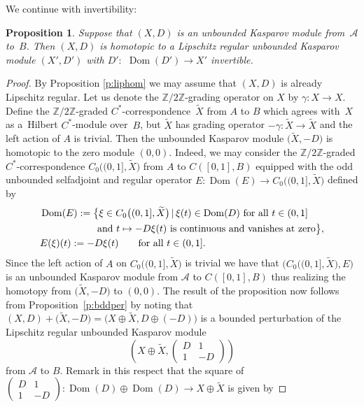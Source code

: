 \documentclass[11pt]{article}
\numberwithin{equation}{section}
\newtheorem{prop}[Theorem]{Proposition}
 { \theoremstyle{definition}
\newtheorem{dfn}[Theorem]{Definition}
\newtheorem{exa}[Theorem]{Example}
\newtheorem{rem}[Theorem]{Remark} }
\newcommand{\op}{\oplus}
\newcommand{\zz}{\mathbb{Z}}
\newcommand{\ga}{\gamma}
\newcommand{\s}[1]{\mathscr{#1}}
\newcommand{\wit}{\widetilde}
\begin{document}
We continue with invertibility:

\begin{prop}\label{p:lipinv}
Suppose that $(X,D)$ is an unbounded Kasparov module from~$\s A$ to~$B$. Then $(X,D)$ is homotopic to a Lipschitz regular unbounded Kasparov module $(X', D')$ with $D'\colon$ $\operatorname{Dom}(D') \to X'$ invertible.
\end{prop}
\begin{proof}By Proposition \ref{p:liphom} we may assume that $(X,D)$ is already Lipschitz regular. Let us denote the $\zz/2\zz$-grading operator on $X$ by $\ga\colon X \to X$. Define the $\zz/2\zz$-graded $C^*$-corresponden\-ce~$\wit{X}$ from $A$ to $B$ which agrees with~$X$ as a~Hilbert $C^*$-module over~$B$, but $\wit{X}$ has grading operator $-\ga\colon \wit{X} \to \wit{X}$ and the left action of $A$ is trivial. Then the unbounded Kasparov module $\big(\wit{X},-D\big)$ is homotopic to the zero module $(0,0)$. Indeed, we may consider the $\zz/2\zz$-graded $C^*$-correspondence $C_0\big( (0,1],\wit{X}\big)$ from $A$ to $C( [0,1],B)$ equipped with the odd unbounded selfadjoint and regular operator $E\colon \operatorname{Dom}(E) \to C_0\big( (0,1],\wit{X}\big)$ defined by
\begin{gather*}
\begin{split}
& \operatorname{Dom}(E) := \big\{ \xi \in C_0\big( (0,1],\wit{X}\big) \,|\, \xi(t) \in \operatorname{Dom}(D) \ \text{for all} \ t \in (0,1] \\
& \hphantom{\operatorname{Dom}(E) := \big\{}{} \text{and} \ t \mapsto - D \xi(t) \ \text{is continuous and vanishes at zero} \big\},\\
& E(\xi)(t) := - D \xi(t) \qquad \text{for all } t \in (0,1] .
\end{split}
\end{gather*}
Since the left action of $A$ on $C_0\big( (0,1],\wit{X}\big)$ is trivial we have that $\big( C_0\big( (0,1],\wit{X}\big), E\big)$ is an unbounded Kasparov module from $\s A$ to $C([0,1],B)$ thus realizing the homotopy from $\big(\wit{X},-D\big)$ to $(0,0)$. The result of the proposition now follows from Proposition~\ref{p:bddper} by noting that $(X,D) + \big(\wit{X}, -D\big) = \big(X \op \wit{X}, D \op (-D)\big)$ is a bounded perturbation of the Lipschitz regular unbounded Kasparov module
\[
\left(X \op \wit{X}, \left(\begin{matrix} D & 1 \\ 1 & - D\end{matrix}\right)\right)
\]
from $\s A$ to $B$. Remark in this respect that the square of $\left(\begin{smallmatrix}D & 1 \\ 1 & - D\end{smallmatrix}\right)\colon \operatorname{Dom}(D) \op \operatorname{Dom}(D) \to X \op \wit{X}$ is given by

\end{proof}
\end{document}
